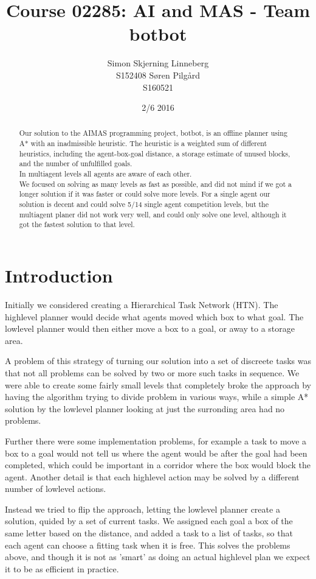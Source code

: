 \documentclass[letterpaper]{article}
\title{Course 02285: AI and MAS - Team botbot}
\author{Simon Skjerning Linneberg\\ S152408 \And Søren Pilgård\\ S160521}
\date{2/6 2016}
\begin{document}
\maketitle

\begin{abstract}
Our solution to the AIMAS programming project, botbot, is an offline planner using A*
with an inadmissible heuristic. The heuristic is a weighted sum of different heuristics,
including the agent-box-goal distance, a storage estimate of unused blocks, and
the number of unfulfilled goals.\\

In multiagent levels all agents are aware of each other.\\

We focused on solving as many levels as fast as possible, and did not mind if we
got a longer solution if it was faster or could solve more levels. For a single
agent our solution is decent and could solve 5/14 single agent competition levels,
but the multiagent planer did not work very well, and could only solve one level,
although it got the fastest solution to that level.
\end{abstract}

\section{Introduction}
Initially we considered creating a Hierarchical Task Network (HTN). The highlevel
planner would decide what agents moved which box to what goal. The lowlevel planner
would then either move a box to a goal, or away to a storage area.

A problem of this strategy of turning our solution into a set of discreete
tasks was that not all problems can be solved by two or more such tasks in
sequence. We were able to create some fairly small levels that completely broke the
approach by having the algorithm trying to divide problem in various ways, while
a simple A* solution by the lowlevel planner looking at just the surronding area had no problems.

Further there were some implementation problems, for example a task to move a box to a goal
would not tell us where the agent would be after the goal had been completed, which
could be important in a corridor where the box would block the agent. Another detail
is that each  highlevel action may be solved by a different number of lowlevel actions.

Instead we tried to flip the approach, letting the lowlevel planner create a
solution, quided by a set of current tasks. We assigned each goal a box of the
same letter based on the distance, and added a task to a list of tasks, so that
each agent can choose a fitting task when it is free. This solves the problems
above, and though it is not as 'smart' as doing an actual highlevel plan we
expect it to be as efficient in practice.\\
\end{document}
